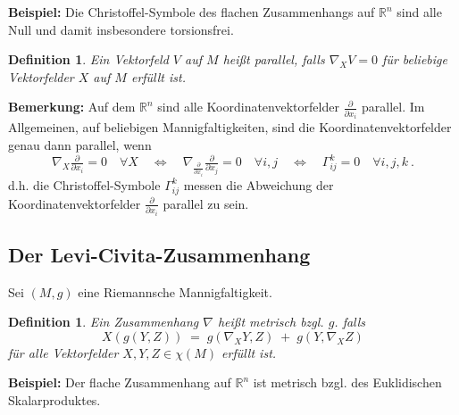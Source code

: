 \documentclass[12pt,a4paper]{article}
\def\R{\mathbb{R}}
\newtheorem{Definition}[Lemma]{Definition}
\begin{document}
\bigskip

{\bf Beispiel:}  Die Christoffel-Symbole des flachen Zusammenhangs auf $\R^n$ sind alle Null und
damit insbesondere torsionsfrei.

\bigskip

\begin{Definition}
Ein Vektorfeld $V$ auf $M$ hei\ss t {\em parallel}, falls $\nabla_XV= 0$ f\"ur beliebige
Vektorfelder $X$ auf $M$ erf\"ullt ist. 
\end{Definition}

\bigskip

{\bf Bemerkung:} Auf dem $\R^n$ sind alle Koordinatenvektorfelder $ \tfrac{\partial }{\partial x_i} $
parallel. Im Allgemeinen, auf beliebigen Mannigfaltigkeiten, sind die Koordinatenvektorfelder
genau dann parallel, wenn
$$
\nabla_X  \tfrac{\partial }{\partial x_i} = 0 \quad \forall  X
\quad\Leftrightarrow\quad
\nabla_{  \tfrac{\partial }{\partial x_i} } \tfrac{\partial }{\partial x_j} = 0
\quad\forall i,j
\quad\Leftrightarrow\quad
\Gamma^k_{ij} = 0 \quad\forall i,j,k \ .
$$
d.h. die Christoffel-Symbole $\Gamma^k_{ij}$ messen die Abweichung der Koordinatenvektorfelder
$ \tfrac{\partial }{\partial x_i} $  parallel zu sein.

\bigskip

\subsection{Der Levi-Civita-Zusammenhang}

\bigskip

Sei $(M,g)$ eine Riemannsche Mannigfaltigkeit.

\begin{Definition}
Ein Zusammenhang $\nabla$ hei\ss t {\em metrisch} bzgl. $g$. falls
$$
X(g(Y, Z)) \;=\; g(\nabla_XY, Z) \;+\; g(Y, \nabla_XZ)
$$ 
f\"ur alle Vektorfelder $X, Y, Z \in \chi(M)$ erf\"ullt ist.
\end{Definition}

\bigskip

{\bf Beispiel:} Der flache Zusammenhang auf $\R^n$ ist metrisch bzgl.
des Euklidischen Skalarproduktes.

\bigskip
\end{document}
